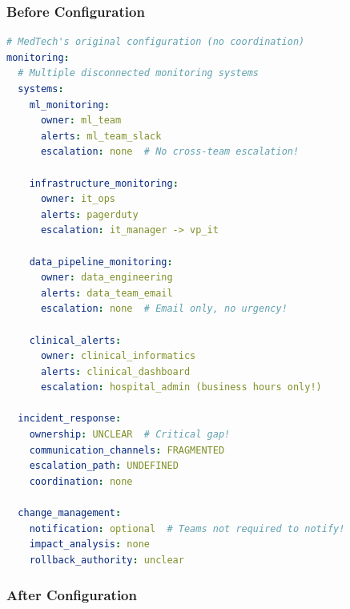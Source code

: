 \subsubsection{Before Configuration}

\begin{lstlisting}[language=yaml, caption={Fragmented Monitoring Configuration}]
# MedTech's original configuration (no coordination)
monitoring:
  # Multiple disconnected monitoring systems
  systems:
    ml_monitoring:
      owner: ml_team
      alerts: ml_team_slack
      escalation: none  # No cross-team escalation!

    infrastructure_monitoring:
      owner: it_ops
      alerts: pagerduty
      escalation: it_manager -> vp_it

    data_pipeline_monitoring:
      owner: data_engineering
      alerts: data_team_email
      escalation: none  # Email only, no urgency!

    clinical_alerts:
      owner: clinical_informatics
      alerts: clinical_dashboard
      escalation: hospital_admin (business hours only!)

  incident_response:
    ownership: UNCLEAR  # Critical gap!
    communication_channels: FRAGMENTED
    escalation_path: UNDEFINED
    coordination: none

  change_management:
    notification: optional  # Teams not required to notify!
    impact_analysis: none
    rollback_authority: unclear
\end{lstlisting}

\subsubsection{After Configuration}

